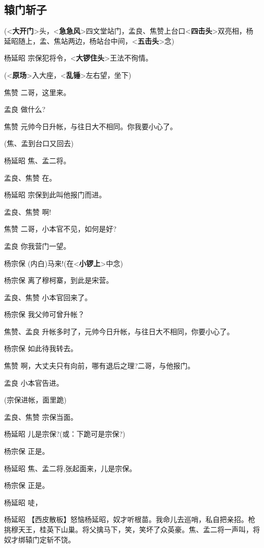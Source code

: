 \hypertarget{ux8f95ux95e8ux65a9ux5b50}{%
\subsection{辕门斩子}\label{ux8f95ux95e8ux65a9ux5b50}}

(\textless{}\textbf{大开门}\textgreater{}头，\textless{}\textbf{急急风}\textgreater{}四文堂站门，孟良、焦赞上台口\textless{}\textbf{四击头}\textgreater{}双亮相，杨延昭随上，孟、焦站两边，杨站台中间，\textless{}\textbf{五击头}\textgreater{}念)

杨延昭
宗保犯将令，\textless{}\textbf{大锣住头}\textgreater{}王法不徇情。

(\textless{}\textbf{原场}\textgreater{}入大座，\textless{}\textbf{乱锤}\textgreater{}左右望，坐下)

焦赞 二哥，这里来。

孟良 做什么?

焦赞 元帅今日升帐，与往日大不相同。你我要小心了。

(焦、孟到台口又回去)

杨延昭 焦、孟二将。

孟良、焦赞 在。

杨延昭 宗保到此叫他报门而进。

孟良、焦赞 啊!

焦赞 二哥，小本官不见，如何是好?

孟良 你我营门一望。

杨宗保 (内白)马来!(在\textless{}\textbf{小锣上}\textgreater{}中念)

杨宗保 离了穆柯寨，到此是宋营。

孟良、焦赞 小本官回来了。

杨宗保 我父帅可曾升帐？

焦赞、孟良 升帐多时了，元帅今日升帐，与往日大不相同，你要小心了。

杨宗保 如此待我转去。

焦赞 啊，大丈夫只有向前，哪有退后之理?二哥，与他报门。

孟良 小本官告进。

(宗保进帐，面里跪)

孟良、焦赞 宗保当面。

杨延昭 儿是宗保?(或：下跪可是宗保?)

杨宗保 正是。

杨延昭 焦、孟二将,张起面来，儿是宗保。

杨宗保 正是。

杨延昭 唗，

杨延昭
【西皮散板】怒恼杨延昭，奴才听根苗。我命儿去巡哨，私自把亲招。枪挑穆天王，桂英下山巢。将父擒马下，笑，笑坏了众英豪。焦、孟二将一声叫，将奴才绑辕门定斩不饶。

